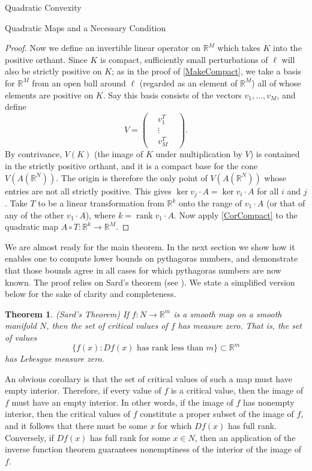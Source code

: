 \documentclass[12pt,oneside,final]{ucthesisucsbmath2010}
\newcommand{\R}{\mathbb{R}}
\DeclareMathOperator{\kernel}{ker}
\DeclareMathOperator{\rank}{rank}
\newtheorem{thm}{Theorem}[section]
\theoremstyle{definition}
\begin{document}
\begin{chapter}{Quadratic Convexity}
\begin{section}{Quadratic Maps and a Necessary Condition}
\begin{proof}
Now we define an invertible linear operator on $\R^M$ which takes $K$ into the positive orthant. Since $K$ is compact, sufficiently small perturbations of $\ell$ will also be strictly positive on $K$; as in the proof of \ref{MakeCompact}, we take a basis for $\R^M$ from an open ball around $\ell$ (regarded as an element of $\R^M$) all of whose elements are positive on $K$. Say this basis consists of the vectors $v_1,\ldots,v_M$, and define 
\[  V=\left(\begin{smallmatrix}  & v_1^T &  \\ & \vdots & \\ &v_M^T&  \end{smallmatrix}\right).\]
By contrivance, $V(K)$ (the image of $K$ under multiplication by $V$) is contained in the strictly positive orthant, and it is a compact base for the cone $V(A(\R^N))$. The origin is therefore the only point of $V(A(\R^N))$ whose entries are not all strictly positive. This gives $\kernel v_j \cdot A = \kernel v_i \cdot A$ for all $i$ and $j$. Take $T$ to be a linear transformation from $\R^k$ onto the range of $v_1 \cdot A$ (or that of any of the other $v_1 \cdot A$), where $k =\rank v_1 \cdot A$. Now apply \ref{CorCompact} to the quadratic map $A\circ T: \R^k \to \R^M$.
\end{proof}

We are almost ready for the main theorem. In the next section we show how it enables one to compute lower bounds on pythagoras numbers, and demonstrate that those bounds agree in all cases for which pythagoras numbers are now known. The proof relies on Sard's theorem (see \cite{Sard}). We state a simplified version below for the sake of clarity and completeness.

\begin{thm}(Sard's Theorem)
If $f: N \to \R^m$ is a smooth map on a smooth manifold $N$, then the set of critical values of $f$ has measure zero. That is, the set of values 
\[\{f(x):Df(x) \text{ has rank less than }m\} \subset \R^m\] 
has Lebesgue measure zero.
\label{Sard}
\end{thm}

An obvious corollary is that the set of critical values of such a map must have empty interior. Therefore, if every value of $f$ is a critical value, then the image of $f$ must have an empty interior. In other words, if the image of $f$ has nonempty interior, then the critical values of $f$ constitute a proper subset of the image of $f$, and it follows that there must be some $x$ for which $Df(x)$ has full rank. Conversely, if $Df(x)$ has full rank for some $x \in N$, then an application of the inverse function theorem guarantees nonemptiness of the interior of the image of $f$. 


\end{section}
\end{chapter}
\end{document}
